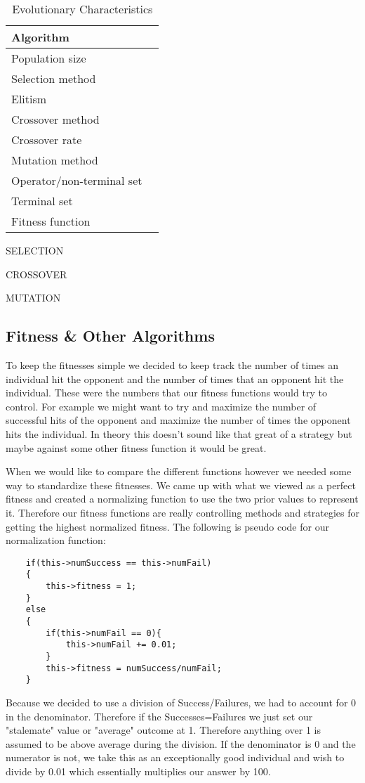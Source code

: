 \documentclass{acm_proc_article-sp}
\begin{document}
\begin{table*}
\centering
\caption{Evolutionary Characteristics}
\begin{tabular}{|l|p{4in}|}
\hline
Algorithm & \\
\hline
Population size & \\
\hline
Selection method & \\
\hline
Elitism & \\
\hline
Crossover method & \\
\hline
Crossover rate & \\
\hline
Mutation method & \\
\hline
Operator/non-terminal set & \\
\hline
Terminal set & \\
\hline
Fitness function & \\
\hline
\end{tabular}
\end{table*}

SELECTION

CROSSOVER

MUTATION

\subsection{Fitness \& Other Algorithms} %

To keep the fitnesses simple we decided to keep track the number of times an individual hit the opponent and the number of times that an opponent hit the individual. These were the numbers that our fitness functions would try to control. For example we might want to try and maximize the number of successful hits of the opponent and maximize the number of times the opponent hits the individual. In theory this doesn't sound like that great of a strategy but maybe against some other fitness function it would be great.

When we would like to compare the different functions however we needed some way to standardize these fitnesses. We came up with what we viewed as a perfect fitness and created a normalizing function to use the two prior values to represent it. Therefore our fitness functions are really controlling methods and strategies for getting the highest normalized fitness. The following is pseudo code for our normalization function:
\begin{verbatim}
    if(this->numSuccess == this->numFail)
    {
        this->fitness = 1;
    }
    else
    {
        if(this->numFail == 0){
            this->numFail += 0.01;
        }
        this->fitness = numSuccess/numFail;
    }
\end{verbatim}
Because we decided to use a division of Success/Failures, we had to account for 0 in the denominator. Therefore if the Successes=Failures we just set our "stalemate" value or "average" outcome at 1. Therefore anything over 1 is assumed to be above average during the division. If the denominator is 0 and the numerator is not, we take this as an exceptionally good individual and wish to divide by 0.01 which essentially multiplies our answer by 100.
\end{document}
